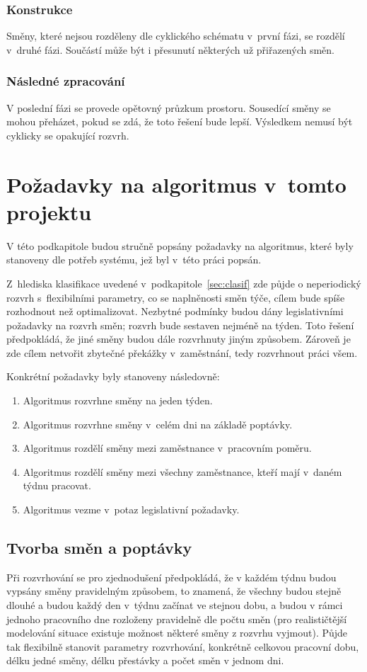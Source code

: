 \documentclass[twoside]{ctuthesis}
\begin{document}
\subsubsection{Konstrukce}
Směny, které nejsou rozděleny dle cyklického schématu v~první fázi, se rozdělí v~druhé fázi. Součástí může být i přesunutí některých už přiřazených směn.

\subsubsection{Následné zpracování}
V poslední fázi se provede opětovný průzkum prostoru. Sousedící směny se mohou přeházet, pokud se zdá, že toto řešení bude lepší. Výsledkem nemusí být cyklicky se opakující rozvrh.

\newpage

\section{Požadavky na algoritmus v~tomto projektu}
V této podkapitole budou stručně popsány požadavky na algoritmus, které byly stanoveny dle potřeb systému, jež byl v~této práci popsán.

Z~hlediska klasifikace uvedené v~podkapitole~\ref{sec:clasif} zde půjde o neperiodický rozvrh s~flexibilními parametry, co se naplněnosti směn týče, cílem bude spíše rozhodnout než optimalizovat. Nezbytné podmínky budou dány legislativními požadavky na rozvrh směn; rozvrh bude sestaven nejméně na týden. Toto řešení předpokládá, že jiné směny budou dále rozvrhnuty jiným způsobem. Zároveň je zde cílem netvořit zbytečné překážky v~zaměstnání, tedy rozvrhnout práci všem.

Konkrétní požadavky byly stanoveny následovně:
\begin{enumerate}
	\item Algoritmus rozvrhne směny na jeden týden.
	\item Algoritmus rozvrhne směny v~celém dni na základě poptávky.
	\item Algoritmus rozdělí směny mezi zaměstnance v~pracovním poměru.
	\item Algoritmus rozdělí směny mezi všechny zaměstnance, kteří mají v~daném týdnu pracovat.
	\item Algoritmus vezme v~potaz legislativní požadavky.
\end{enumerate}

\subsection{Tvorba směn a poptávky}\label{sub:demand}
Při rozvrhování se pro zjednodušení předpokládá, že v každém týdnu budou vypsány směny pravidelným způsobem, to znamená, že všechny budou stejně dlouhé a budou každý den v~týdnu začínat ve stejnou dobu, a budou v rámci jednoho pracovního dne rozloženy pravidelně dle počtu směn (pro realističtější modelování situace existuje možnost některé směny z rozvrhu vyjmout). Půjde tak flexibilně stanovit parametry rozvrhování, konkrétně celkovou pracovní dobu, délku jedné směny, délku přestávky a počet směn v jednom dni. 
\end{document}
